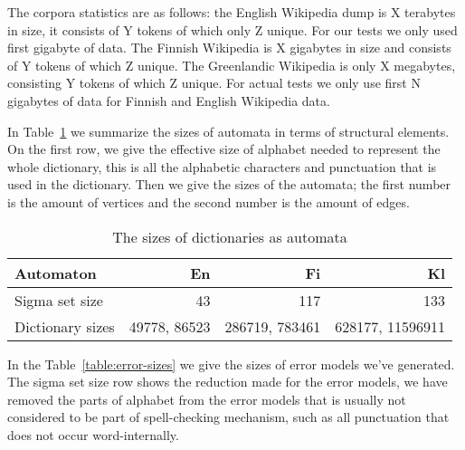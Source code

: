 \documentclass[11pt]{article}
\begin{document}
The corpora statistics are as follows: the English Wikipedia dump is X terabytes
in size, it consists of Y tokens of which only Z unique. For our tests we
only used first gigabyte of data. The Finnish Wikipedia is X gigabytes in size
and consists of Y tokens of which Z unique. The Greenlandic Wikipedia is only
X megabytes, consisting Y tokens of which Z unique. For actual tests we only use
first N gigabytes of data for Finnish and English Wikipedia data.

In Table~\ref{table:dictionary-sizes} we summarize the sizes of automata in
terms of structural elements. On the first row, we give the effective size of
alphabet needed to represent the whole dictionary, this is all the alphabetic
characters and punctuation that is used in the dictionary. Then we give the
sizes of the automata; the first number is the amount of vertices and the
second number is the amount of edges.

\begin{table}[h]
\begin{center}
\begin{scriptsize}
\begin{tabular}{|l|rrr|}
\hline
\bf Automaton & \bf En & \bf Fi & \bf Kl  \\ 
\hline
Sigma set size &
 43& 117& 133
\\
Dictionary sizes &
 49778, 86523& 286719, 783461& 628177, 11596911 \\
\hline
\end{tabular}
\end{scriptsize}
\end{center}
\caption{\label{table:dictionary-sizes}
The sizes of dictionaries as automata}
\end{table}

In the Table~\ref{table:error-sizes} we give the sizes of error models we've
generated. The sigma set size row shows the reduction made for the error models,
we have removed the parts of alphabet from the error models that is usually not
considered to be part of spell-checking mechanism, such as all punctuation that
does not occur word-internally.
\end{document}
